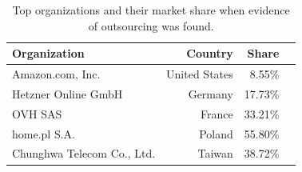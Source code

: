 \begin{table}[!ht]
\centering
\small
\begin{tabular}{lrrr}
\hline
\textbf{Organization} & \textbf{Country} & \textbf{Share} \\
\hline
Amazon.com, Inc. & United States & 8.55\% \\
Hetzner Online GmbH & Germany & 17.73\% \\
OVH SAS	& France & 33.21\% \\
home.pl S.A. & Poland & 55.80\% \\
Chunghwa Telecom Co., Ltd. & Taiwan & 38.72\% \\
\hline
\end{tabular}
\caption{Top organizations and their market share when evidence of outsourcing was found.}
\label{tab:outsourcing_org_country}
\end{table}